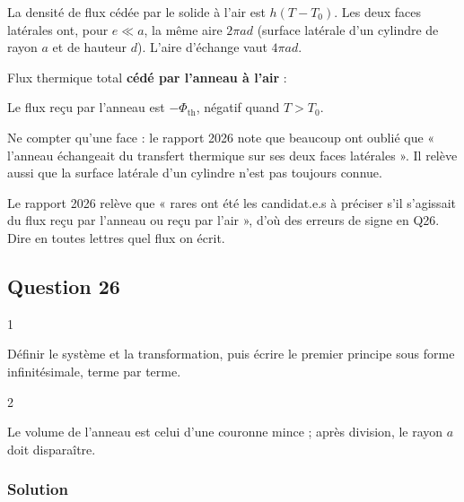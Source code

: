 \documentclass[11pt,a4paper]{article}
\newcommand{\equationajustee}[1]{%
  \sbox{\boiteequation}{$\displaystyle #1$}%
  \ifdim\wd\boiteequation>\linewidth
    \[\resizebox{\linewidth}{!}{\usebox{\boiteequation}}\]%
  \else
    \[#1\]%
  \fi}
\begin{document}
La densité de flux cédée par le solide à l'air est \(h(T-T_0)\). Les deux faces latérales ont, pour \(e\ll a\), la même aire \(2\pi ad\) (surface latérale d'un cylindre de rayon \(a\) et de hauteur \(d\)). L'aire d'échange vaut \(4\pi ad\).

Flux thermique total \textbf{cédé par l'anneau à l'air} :

\equationajustee{\boxed{\Phi_{\text{th}}=4\pi a\,d\,h\,\big(T(t)-T_0\big)}}

Le flux reçu par l'anneau est \(-\Phi_{\text{th}}\), négatif quand \(T>T_0\).

\begin{piege}

Ne compter qu'une face : le rapport 2026 note que beaucoup ont oublié que « l'anneau échangeait du transfert thermique sur ses deux faces latérales ». Il relève aussi que la surface latérale d'un cylindre n'est pas toujours connue.

\end{piege}

\begin{jury}

Le rapport 2026 relève que « rares ont été les candidat.e.s à préciser s'il s'agissait du flux reçu par l'anneau ou reçu par l'air », d'où des erreurs de signe en Q26. Dire en toutes lettres quel flux on écrit.

\end{jury}

\hypertarget{question-26}{%
\subsection{Question 26}\label{question-26}}

\begin{indication}{1}

Définir le système et la transformation, puis écrire le premier principe sous forme infinitésimale, terme par terme.

\end{indication}

\begin{indication}{2}

Le volume de l'anneau est celui d'une couronne mince ; après division, le rayon \(a\) doit disparaître.

\end{indication}

\hypertarget{solution-25}{%
\subsubsection{Solution}\label{solution-25}}
\end{document}
